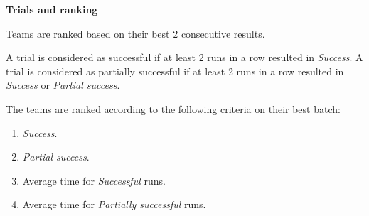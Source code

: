 {{\bfseries Trials and ranking}

\smallskip

Teams are ranked based on their best 2 consecutive results.

A trial is considered as successful if at least 2 runs in a row resulted in \textit{Success}. A trial is considered as
partially successful if at least 2 runs in a row resulted in \textit{Success} or \textit{Partial success}.

The teams are ranked according to the following criteria on their best batch:
\begin{enumerate}
\item \textit{Success}.
\item \textit{Partial success}.
\item Average time for \textit{Successful} runs.
\item Average time for \textit{Partially successful} runs.
\end{enumerate}
}